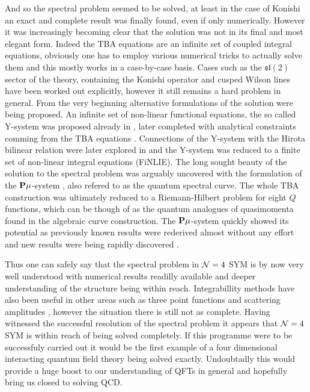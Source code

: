 And so the spectral problem seemed to be solved, at least in the case of Konishi an exact and complete result was finally found, even if only numerically.
However it was increasingly becoming clear that the solution was not in its final and most elegant form.
Indeed the TBA equations are an infinite set of coupled integral equations, obviously one has to employ various numerical tricks to actually solve them and this mostly works in a case-by-case basis. 
Cases such as the $\mathfrak{sl}(2)$ sector of the theory, containing the Konishi operator \cite{Gromov:2009bc} and cusped Wilson lines \cite{Correa:2012hh, Gromov:2012eu} have been worked out explicitly, however it still remains a hard problem in general.
From the very beginning alternative formulations of the solution were being proposed. 
An infinite set of non-linear functional equations, the so called Y-system was proposed already in \cite{Gromov:2009bc}, later completed with analytical constraints comming from the TBA equations \cite{Cavaglia:2010nm}.
Connections of the Y-system with the Hirota bilinear relation were later explored in \cite{Gromov:2011cx} and the Y-system was reduced to a finite set of non-linear integral equations (FiNLIE).
The long sought beauty of the solution to the spectral problem was arguably uncovered with the formulation of the ${\bf P}\mu$-system \cite{Gromov:2013pga}, also refered to as the quantum spectral curve.
The whole TBA construction was ultimately reduced to a Riemann-Hilbert problem for eight $Q$ functions, which can be though of as the quantum analogues of quasimomenta found in the algebraic curve construction.
The ${\bf P}\mu$-system quickly showed its potential as previously known results were rederived almost without any effort and new results were being rapidly discovered \cite{Gromov:2013qga, Gromov:2014bva}.

Thus one can safely say that the spectral problem in $\mathcal{N}=4$ SYM is by now very well understood with numerical results readilly available and deeper understanding of the structure being within reach.
Integrabillity methods have also been useful in other areas such as three point functions \cite{Escobedo:2010xs, Gromov:2012vu} and scattering amplitudes \cite{Drummond:2010km, Alday:2010kn}, however the situation there is still not as complete.
Having witnessed the successful resolution of the spectral problem it appears that $\mathcal{N}=4$ SYM is within reach of being solved completely.
If this programme were to be successfuly carried out it would be the first example of a four dimensional interacting quantum field theory being solved exactly.
Undoubtadly this would provide a huge boost to our understanding of QFTs in general and hopefully bring us closed to solving QCD.


